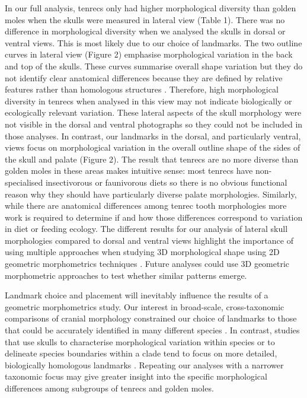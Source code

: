 \documentclass[12pt,a4paper]{article}
\begin{document}
	In our full analysis, tenrecs only had higher morphological diversity than golden moles when the skulls were measured in lateral view (Table 1). There was no difference in morphological diversity when we analysed the skulls in dorsal or ventral views. This is most likely due to our choice of landmarks. The two outline curves in lateral view (Figure 2) emphasise morphological variation in the back and top of the skulls. These curves summarise overall shape variation but they do not identify clear anatomical differences because they are defined by relative features rather than homologous structures \citep{Zelditch2012}. Therefore, high morphological diversity in tenrecs when analysed in this view may not indicate biologically or ecologically relevant variation.	
	These lateral aspects of the skull morphology were not visible in the dorsal and ventral photographs so they could not be included in those analyses. In contrast, our landmarks in the dorsal, and particularly ventral, views focus on morphological variation in the overall outline shape of the sides of the skull and palate (Figure 2). The result that tenrecs are no more diverse than golden moles in these areas makes intuitive sense: most tenrecs have non-specialised insectivorous or faunivorous diets \citep{Olson2013} so there is no obvious functional reason why they should have particularly diverse palate morphologies. Similarly, while there are anatomical differences among tenrec tooth morphologies \citep{Asher2005} more work is required to determine if and how those differences correspond to variation in diet or feeding ecology. The different results for our analysis of lateral skull morphologies compared to dorsal and ventral views highlight the importance of using multiple approaches when studying 3D morphological shape using 2D geometric morphometrics techniques \citep{Arnqvist1998}. Future analyses could use 3D geometric morphometric approaches to test whether similar patterns emerge. 
    
    Landmark choice and placement will inevitably influence the results of a geometric morphometrics study. Our interest in broad-scale, cross-taxonomic comparisons of cranial morphology constrained our choice of landmarks to those that could be accurately identified in many different species \citep[e.g.][]{Ruta2013, Goswami2011, Wroe2007, Goswami2006}. In contrast, studies that use skulls to characterise morphological variation within species \citep[e.g.][]{Blagojevic2011, Giannini2010, Flores2010, Bornholdt2008} or to delineate species boundaries within a clade \citep[e.g.][]{Panchetti2008} tend to focus on more detailed, biologically homologous landmarks \citep{Zelditch2012}. Repeating our analyses with a narrower taxonomic focus may give greater insight into the specific morphological differences among subgroups of tenrecs and golden moles.
	
\end{document}
